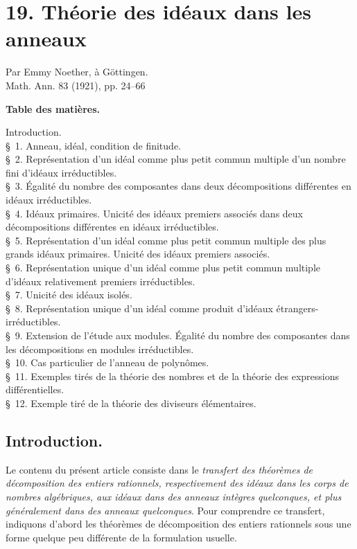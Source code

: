 \section*{19. Théorie des idéaux dans les anneaux}
\begin{center}
Par Emmy Noether, à Göttingen.\\[0.9em]
Math. Ann. 83 (1921), pp. 24--66
\end{center}

\begin{center}\textbf{Table des matières.}\end{center}
\noindent Introduction.\\
\S~1. Anneau, idéal, condition de finitude.\\
\S~2. Représentation d'un idéal comme plus petit commun multiple d'un nombre fini d'idéaux irréductibles.\\
\S~3. Égalité du nombre des composantes dans deux décompositions différentes en idéaux irréductibles.\\
\S~4. Idéaux primaires. Unicité des idéaux premiers associés dans deux décompositions différentes en idéaux irréductibles.\\
\S~5. Représentation d'un idéal comme plus petit commun multiple des plus grands idéaux primaires. Unicité des idéaux premiers associés.\\
\S~6. Représentation unique d'un idéal comme plus petit commun multiple d'idéaux relativement premiers irréductibles.\\
\S~7. Unicité des idéaux isolés.\\
\S~8. Représentation unique d'un idéal comme produit d'idéaux étrangers-irréductibles.\\
\S~9. Extension de l'étude aux modules. Égalité du nombre des composantes dans les décompositions en modules irréductibles.\\
\S~10. Cas particulier de l'anneau de polynômes.\\
\S~11. Exemples tirés de la théorie des nombres et de la théorie des expressions différentielles.\\
\S~12. Exemple tiré de la théorie des diviseurs élémentaires.

\subsection*{Introduction.}

Le contenu du présent article consiste dans le \emph{transfert des théorèmes de décomposition des entiers rationnels, respectivement des idéaux dans les corps de nombres algébriques, aux idéaux dans des anneaux intègres quelconques, et plus généralement dans des anneaux quelconques}. Pour comprendre ce transfert, indiquons d'abord les théorèmes de décomposition des entiers rationnels sous une forme quelque peu différente de la formulation usuelle.

